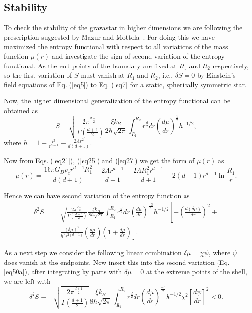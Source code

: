 \documentclass[preprint,12pt]{elsarticle}
\begin{document}
\subsection{Stability}
To check the stability of the gravastar in higher dimensions we are following the prescription suggested by Mazur and Mottola~\cite{Mazur2001,Mazur2004}. For doing this we have maximized the entropy functional with respect to all variations of the mass function $\mu(r)$ and investigate the sign of second variation of the entropy functional. As the end points of the boundary are fixed at $R_1$ and $R_2$ respectively, so the first variation of $S$ must vanish at $R_1$ and $R_2$, i.e., $\delta S=0$ by Einstein's field equations of Eq. (\ref{eq5}) to Eq. (\ref{eq7} for a static, spherically symmetric star.

Now, the higher dimensional generalization of the entropy functional can be obtained as
\begin{equation}
S =  \sqrt{\frac{2\pi^{\frac{d+1}{2}}}{\Gamma(\frac{d+1}{2})}}\frac{\xi k_B}{2 \hbar \sqrt{2\pi}}\int^{R_2}_{R_1} r^{\frac{d}{2}}dr \left(\frac{d\mu}{dr}\right)^{\frac{1}{2}} h^{-1/2}, \label{eq49}
\end{equation}
where $h=1-\frac{\mu}{r^{d-1}}-\frac{2\Lambda r^2}{d(d+1)}$.

Now from Eqs. (\ref{eq21}), (\ref{eq25}) and (\ref{eq27}) we get the form of $\mu(r)$ as
\begin{equation}
 \mu(r)=\frac{16\pi G_D \rho_c r^{d-1}R_1^2}{d(d+1)}+\frac{2\Lambda r^{d+1}}{d+1} -\frac{2\Lambda R_1^2 r^{d-1}}{d+1}+2(d-1)r^{d-1}\ln{\frac{R_1}{r}}. \label{eq50}
\end{equation}

Hence we can have second variation of the entropy function as
\begin{eqnarray}
\delta^2 S &=&  \sqrt{\frac{2\pi^{\frac{d+1}{2}}}{\Gamma(\frac{d+1}{2})}}\frac{\xi k_B}{8 \hbar \sqrt{2\pi}}\int^{R_2}_{R_1} r^{\frac{d}{2}}dr \left(\frac{d\mu}{dr}\right)^{\frac{-3}{2}} h^{-1/2}\left[-\left(\frac{d(\delta \mu)}{dr}\right)^2+\nonumber \right.\\
 && \left.\frac{(\delta \mu)^2}{h^2r^{2(d-1)}}\left(\frac{d\mu}{dr}\right)\left(1+\frac{d\mu}{dr}\right)\right]. \label{eq50a}
\end{eqnarray}

As a next step we consider the following linear combination $\delta \mu = \chi \psi$, where $\psi$ does vanish at the endpoints. Now insert this into the second variation (Eq. \ref{eq50a}), after integrating by parts with $\delta \mu =0$ at the extreme points of the shell, we are left with
\begin{equation}
\delta^2 S = - \sqrt{\frac{2\pi^{\frac{d+1}{2}}}{\Gamma(\frac{d+1}{2})}}\frac{\xi k_B}{8 \hbar \sqrt{2\pi}}\int^{R_2}_{R_1} r^{\frac{d}{2}}dr \left(\frac{d\mu}{dr}\right)^{\frac{-3}{2}} h^{-1/2}\chi^2\left[\frac{d\psi}{dr}\right]^2 < 0. \label{eq50b}
\end{equation}
\end{document}
